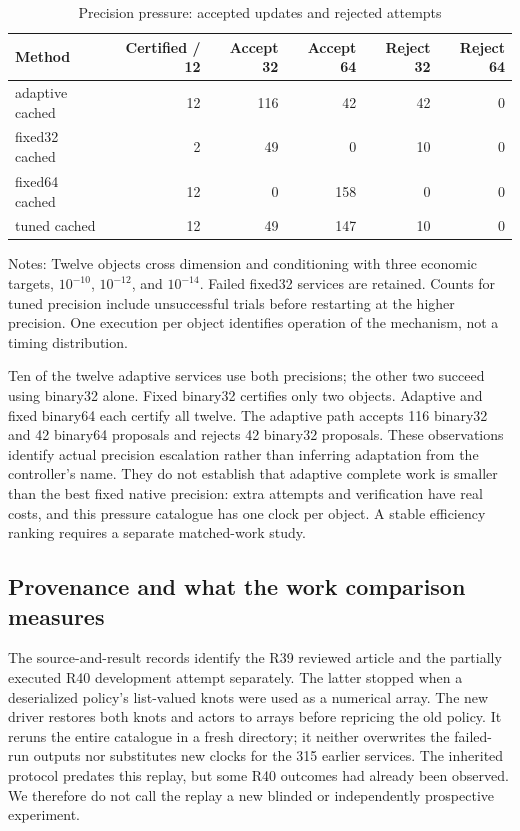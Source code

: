 \documentclass[ecta,nameyear,draft]{econsocart}
\theoremstyle{definition}
\theoremstyle{remark}
\begin{document}
\begin{table}[htbp]\centering\small
\caption{Precision pressure: accepted updates and rejected attempts}\label{tab:r41precision}
\begin{tabular}{lrrrrr}\toprule
Method & Certified / 12 & Accept 32 & Accept 64 & Reject 32 & Reject 64\\\midrule
adaptive cached & 12 & 116 & 42 & 42 & 0\\
fixed32 cached & 2 & 49 & 0 & 10 & 0\\
fixed64 cached & 12 & 0 & 158 & 0 & 0\\
tuned cached & 12 & 49 & 147 & 10 & 0\\
\bottomrule\end{tabular}
\par\smallskip\begin{minipage}{.97\textwidth}\footnotesize Notes: Twelve objects cross dimension and conditioning with three economic targets, $10^{-10}$, $10^{-12}$, and $10^{-14}$. Failed fixed32 services are retained. Counts for tuned precision include unsuccessful trials before restarting at the higher precision. One execution per object identifies operation of the mechanism, not a timing distribution.\end{minipage}\end{table}

Ten of the twelve adaptive services use both precisions; the other two
succeed using binary32 alone. Fixed binary32 certifies only two objects.
Adaptive and fixed binary64 each certify all twelve. The adaptive path
accepts 116 binary32 and 42 binary64 proposals and rejects 42 binary32
proposals. These observations identify actual precision escalation rather
than inferring adaptation from the controller's name. They do not establish
that adaptive complete work is smaller than the best fixed native precision:
extra attempts and verification have real costs, and this pressure catalogue
has one clock per object. A stable efficiency ranking requires a separate
matched-work study.

\subsection{Provenance and what the work comparison measures}
The source-and-result records identify the R39 reviewed article and the
partially executed R40 development attempt separately. The latter stopped
when a deserialized policy's list-valued knots were used as a numerical
array. The new driver restores both knots and actors to arrays before
repricing the old policy. It reruns the entire catalogue in a fresh directory;
it neither overwrites the failed-run outputs nor substitutes new clocks
for the 315 earlier services. The inherited protocol predates this replay,
but some R40 outcomes had already been observed. We therefore do not call
the replay a new blinded or independently prospective experiment.
\end{document}
